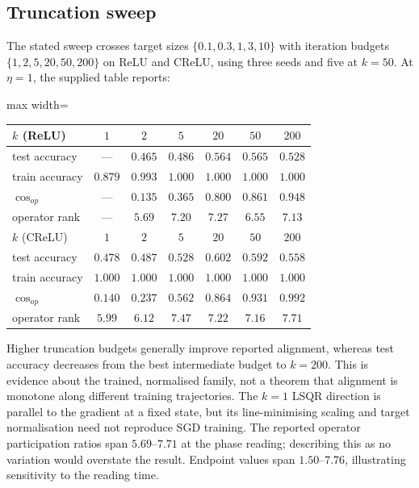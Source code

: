 \documentclass{article}
\theoremstyle{definition}
\theoremstyle{remark}
\begin{document}
\subsection{Truncation sweep}\label{app:e7}

The stated sweep crosses target sizes $\{0.1,0.3,1,3,10\}$ with iteration budgets $\{1,2,5,20,50,200\}$ on ReLU and CReLU, using three seeds and five at $k=50$. At $\eta=1$, the supplied table reports:

\begin{center}\small
\begin{adjustbox}{max width=\linewidth}
\begin{tabular}{lcccccc}
\toprule
$k$ (ReLU) & $1$ & $2$ & $5$ & $20$ & $50$ & $200$ \\
\midrule
test accuracy   & ---     & $0.465$ & $0.486$ & $0.564$ & $\mathbf{0.565}$ & $0.528$ \\
train accuracy  & $0.879$ & $0.993$ & $1.000$ & $1.000$ & $1.000$ & $1.000$ \\
$\cos_{op}$     & ---     & $0.135$ & $0.365$ & $0.800$ & $0.861$ & $0.948$ \\
operator rank   & ---     & $5.69$  & $7.20$  & $7.27$  & $6.55$  & $7.13$ \\
\midrule
$k$ (CReLU) & $1$ & $2$ & $5$ & $20$ & $50$ & $200$ \\
\midrule
test accuracy   & $0.478$ & $0.487$ & $0.528$ & $\mathbf{0.602}$ & $0.592$ & $0.558$ \\
train accuracy  & $1.000$ & $1.000$ & $1.000$ & $1.000$ & $1.000$ & $1.000$ \\
$\cos_{op}$     & $0.140$ & $0.237$ & $0.562$ & $0.864$ & $0.931$ & $0.992$ \\
operator rank   & $5.99$  & $6.12$  & $7.47$  & $7.22$  & $7.16$  & $7.71$ \\
\bottomrule
\end{tabular}
\end{adjustbox}
\end{center}

Higher truncation budgets generally improve reported alignment, whereas test accuracy decreases from the best intermediate budget to $k=200$. This is evidence about the trained, normalised family, not a theorem that alignment is monotone along different training trajectories. The $k=1$ LSQR direction is parallel to the gradient at a fixed state, but its line-minimising scaling and target normalisation need not reproduce SGD training. The reported operator participation ratios span $5.69$--$7.71$ at the phase reading; describing this as no variation would overstate the result. Endpoint values span $1.50$--$7.76$, illustrating sensitivity to the reading time.
\end{document}

